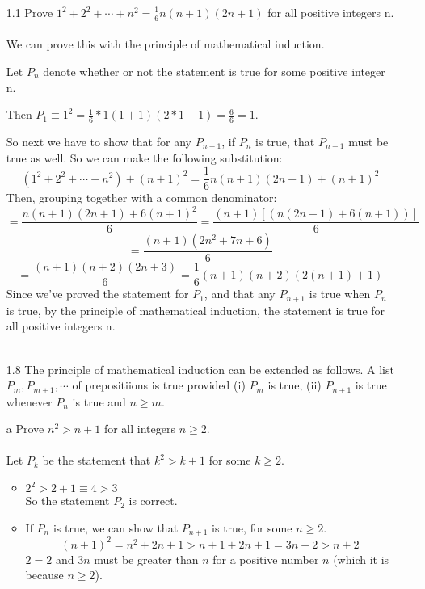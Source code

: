 
\usepackage{amsmath, dsfont}

\oddsidemargin 0in
\evensidemargin 0in
\textwidth 6.5in
\topmargin -0.5in
\textheight 9.0in
\newcommand{\norm}[1]{\left\lVert #1 \right\rVert}
\newcommand{\?}{\stackrel{?}{=}}



\pagestyle{myheadings}

\begin{itemize}
  \item [1.1]
    Prove $1^2 + 2^2 + \cdots + n^2 = \frac{1}{6} n (n+1)(2n+1)$ for all positive integers n.\\\\

    We can prove this with the principle of mathematical induction.
    
    Let $P_n$ denote whether or not the statement is true for some positive integer n. 

    Then $P_1 \equiv 1^2 = \frac{1}{6} * 1(1 + 1)(2*1 + 1) = \frac{6}{6} = 1$.

    So next we have to show that for any $P_{n+1}$, if $P_n$ is true, that $P_{n+1}$ must be true as well. So we can make the following substitution:\\
    $$(1^2 + 2^2 + \cdots + n^2) + (n+1)^2 = \frac{1}{6}n(n+1)(2n+1) + (n+1)^2$$
    Then, grouping together with a common denominator:
    $$ = \frac{n(n+1)(2n+1) + 6(n+1)^2}{6} = \frac{(n+1)[(n(2n+1) + 6(n+1))]}{6}$$
    $$ = \frac{(n+1)(2n^2+7n+6)}{6}$$
    $$ = \frac{(n+1)(n+2)(2n+3)}{6} = \frac{1}{6}(n+1)(n+2)(2(n+1) + 1)$$
    Since we've proved the statement for $P_1$, and that any $P_{n+1}$ is true when $P_n$ is true, by the principle of mathematical induction, the statement is true for all positive integers n.\\\\


  \item [1.8]
    The principle of mathematical induction can be extended as follows. A list $P_m, P_{m+1}, \cdots$ of prepositiions is true provided (i) $P_m$ is true, (ii) $P_{n+1}$ is true whenever $P_n$ is true and $n \geq m$.
    \item [a] Prove $n^2 > n + 1$ for all integers $n \geq 2$. \\\\
      
      Let $P_k$ be the statement that $k^2 > k + 1$ for some $k \geq 2$.
      \begin{itemize}
        \item
          $2^2 > 2 + 1 \equiv 4 > 3$\\
          So the statement $P_2$ is correct.
        \item
          If $P_n$ is true, we can show that $P_{n+1}$ is true, for some $n \geq 2$.
          $$(n+1)^2 = n^2 + 2n + 1 > n + 1 + 2n + 1 = 3n + 2 > n + 2$$
          $2 = 2$ and $3n$ must be greater than $n$ for a positive number $n$ (which it is because $n \geq 2$).\\          
      \end{itemize}


\end{itemize}
